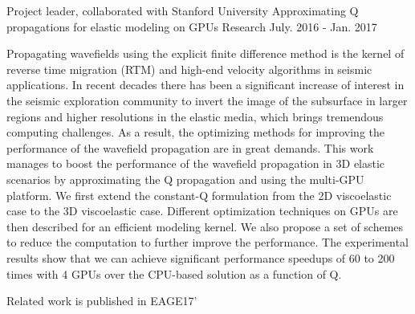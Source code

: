 \documentclass[11pt, a4paper]{awesome-cv}
\begin{document}
\begin{cventries}
  \cventry
    {Project leader, collaborated with Stanford University} %
    {Approximating Q propagations for elastic modeling on GPUs} %
    {Research} %
    {July. 2016 - Jan. 2017} %
    {
      \begin{cvitems} %
        \item {Propagating wavefields using the explicit finite difference method is the kernel of reverse time migration (RTM) and high-end velocity algorithms in seismic applications. In recent decades there has been a significant increase of interest in the seismic exploration community to invert the image of the subsurface in larger regions and higher resolutions in the elastic media, which brings tremendous computing challenges. As a result, the optimizing methods for improving the performance of the wavefield propagation are in great demands. This work manages to boost the performance of the wavefield propagation in 3D elastic scenarios by approximating the Q propagation and using the multi-GPU platform. We first extend the constant-Q formulation from the 2D viscoelastic case to the 3D viscoelastic case. Different optimization techniques on GPUs are then described for an efficient modeling kernel. We also propose a set of schemes to reduce the computation to further improve the performance. The experimental results show that we can achieve significant performance speedups of 60 to 200 times with 4 GPUs over the CPU-based solution as a function of Q.​}
       \item {Related work is published in EAGE17'}
      \end{cvitems}
    }
  

\end{cventries}
\end{document}
